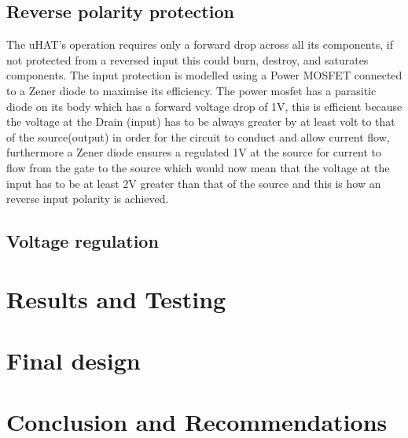 \documentclass[class=report,11pt,crop=false]{standalone}
\begin{document}
	\subsection{Reverse polarity protection}
	\vspace{0.5cm}
	The uHAT’s operation requires only a forward drop across all its components, if not
	protected from a reversed input this could burn, destroy, and saturates components. The
	input protection is modelled using a Power MOSFET connected to a Zener diode to
	maximise its efficiency. The power mosfet has a parasitic diode on its body which has a
	forward voltage drop of 1V, this is efficient because the voltage at the Drain (input) has to be
	always greater by at least volt to that of the source(output) in order for the circuit to conduct
	and allow current flow, furthermore a Zener diode ensures a regulated 1V at the source for
	current to flow from the gate to the source which would now mean that the voltage at the
	input has to be at least 2V greater than that of the source and this is how an reverse input
	polarity is achieved.
	
	\subsection{Voltage regulation}
	\section{Results and Testing}
	\section{Final design}
	\section{Conclusion and Recommendations}
	
\end{document}
